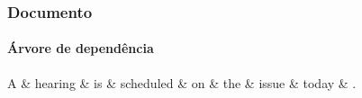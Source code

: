 \begin{frame}[fragile]
\frametitle{Documento}
\framesubtitle{Árvore de dependência}
 
  \begin{fmpage}{\textwidth}
   \begin{dependency}[theme = simple]
   \begin{deptext}[column sep=1em]
      A \& hearing \& is \& scheduled \& on \& the \& issue \& today \& . \\
   \end{deptext}
   \end{dependency}
  \end{fmpage}

\end{frame}
